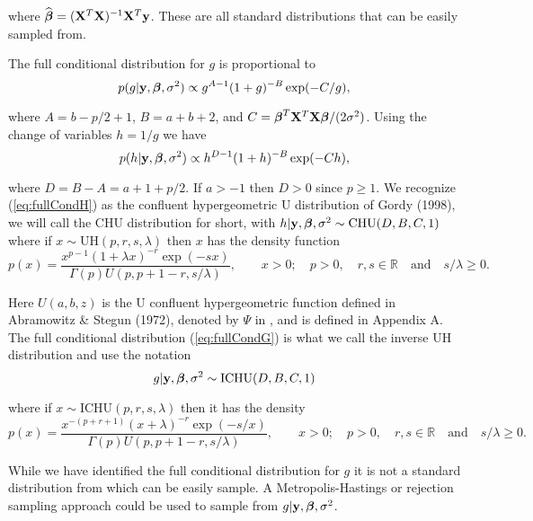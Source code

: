 \documentclass{article}[12pt]
\def\bR{{\mathbb R}}
\begin{document}
\noindent 
where $\widehat{{\boldsymbol \beta}} = ({\bf X}^T{\bf X})^{-1}{\bf X}^T{\bf y}$.
These are all standard distributions that can be easily sampled from.



The full conditional distribution for $g$ is proportional to
\begin{equation}
\label{eq:fullCondG}
\displaystyle p(g|{\bf y},{\boldsymbol \beta},\sigma^2) \propto g^{A-1} (1 + g)^{-B}\exp( - C/g),
\end{equation}

\noindent where $A = b - p/2 + 1$, $B = a + b + 2$, and $C = {\boldsymbol \beta}^T{\bf X}^T{\bf X}{\boldsymbol \beta}/(2\sigma^2)$. 
Using the change of variables $h = 1/g$ we have
\begin{equation}
\label{eq:fullCondH}
p(h|{\bf y},{\boldsymbol \beta},\sigma^2)\propto h^{D-1}  (1 + h)^{-B}\exp( - Ch),
\end{equation}


\noindent 
where $D = B - A = a  + 1  + p/2$. If $a > - 1$ then $D>0$ since $p\ge 1$.
We recognize (\ref{eq:fullCondH}) as 
the confluent hypergeometric U distribution of
Gordy (1998), we will call the CHU distribution for short, with
$h |{\bf y},{\boldsymbol \beta},\sigma^2 \sim \mbox{CHU}(D,B,C,1)$
where if $x\sim\mbox{UH}(p,r,s,\lambda)$ then $x$ has the density function
$$
p(x) = \frac{x^{p-1}(1 + \lambda x)^{-r}\exp(-sx)}{\Gamma(p)U(p,p+1-r,s/\lambda)}, \qquad x>0; \quad p>0, \quad r, s\in \bR  \quad \mbox{and} \quad 
s/\lambda\ge 0. 
$$

\noindent Here $U(a,b,z)$ is the 
U confluent hypergeometric function defined in Abramowitz \& Stegun (1972), denoted by $\Psi$ in \cite{Gradshteyn2007}, and is defined in Appendix A.
The full conditional distribution (\ref{eq:fullCondG}) 
is what we call the inverse
UH distribution and use the notation
$$
\displaystyle g |{\bf y},{\boldsymbol \beta},\sigma^2 \sim \mbox{ICHU}(D,B,C,1)
$$

\noindent where if
$x\sim\mbox{ICHU}(p,r,s,\lambda)$ then it has the
density
$$
p(x) = \frac{x^{-(p+r+1)}(x + \lambda)^{-r}\exp(-s/x)}{\Gamma(p)U(p,p+1-r,s/\lambda)},\qquad x>0; \quad p>0, \quad r, s\in \bR  \quad \mbox{and} \quad 
s/\lambda\ge 0. 
$$

\noindent While we have identified the full conditional distribution for $g$ it is not a standard distribution from which can be easily sample. A Metropolis-Hastings or rejection sampling approach could be used to sample from
$g |{\bf y},{\boldsymbol \beta},\sigma^2$. 
\end{document}

